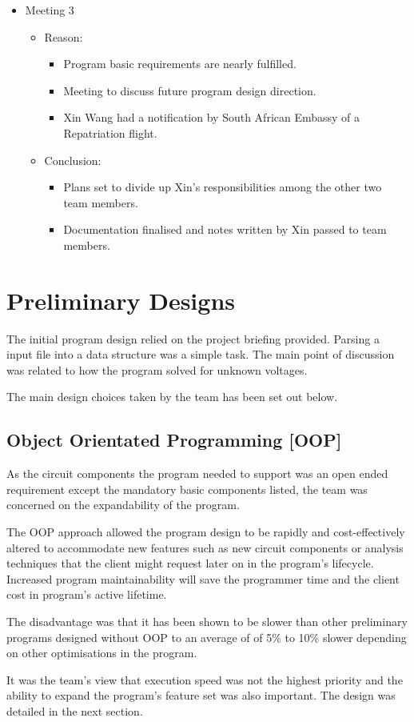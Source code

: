 \documentclass[12pt,a4paper]{article}
\begin{document}
\begin{itemize}
\begin{itemize}
\begin{itemize}
			\end{itemize}
		\end{itemize}
		\item Meeting 3
		\begin{itemize}
			\item Reason:
			\begin{itemize}
				\item Program basic requirements are nearly fulfilled. 
				\item Meeting to discuss future program design direction.
				\item Xin Wang had a notification by South African Embassy of a Repatriation flight.
			\end{itemize}
			\item Conclusion:
			\begin{itemize}
				\item Plans set to divide up Xin's responsibilities among the other two team members.
				\item Documentation finalised and notes written by Xin passed to team members.
			\end{itemize}
		\end{itemize}
	\end{itemize}
	\pagebreak

	

\section{Preliminary Designs}
The initial program design relied on the project briefing provided. Parsing a input file into a data 
structure was a simple task. The main point of discussion was related to how the program solved for unknown voltages.
\par
The main design choices taken by the team has been set out below.
	\subsection{Object Orientated Programming [OOP]}
	As the circuit components the program needed to support was an open ended requirement except the mandatory basic components 
	listed, the team was concerned on the expandability of the program.
	\par
	The OOP approach allowed the program design to be rapidly and cost-effectively altered to accommodate new features
	such as new circuit components or analysis techniques \cite{OOP} that the client might request later on in the 
	program's lifecycle. Increased program maintainability will save the programmer time and the client cost in program's 
	active lifetime.
	\par
	The disadvantage was that it has been shown to be slower than other preliminary programs designed 
	without OOP to an average of of 5\% to 10\% slower depending on other optimisations in the program.
	\par 
	It was the team's view that execution speed was not the highest priority and the ability to expand the program's feature set
	was also important. The design was detailed in the next section.
\end{document}
